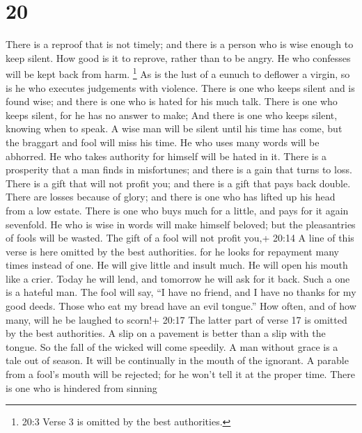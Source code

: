 \hypertarget{section-16}{%
\section{20}\label{section-16}}

 There is a reproof that is not timely; and there is a
person who is wise enough to keep silent.  How good is it to
reprove, rather than to be angry. He who confesses will be kept back
from harm.  \footnote{20:3 Verse 3 is omitted by the best
  authorities.}  As is the lust of a eunuch to deflower a
virgin, so is he who executes judgements with violence. 
There is one who keeps silent and is found wise; and there is one who is
hated for his much talk.  There is one who keeps silent, for
he has no answer to make; And there is one who keeps silent, knowing
when to speak.  A wise man will be silent until his time has
come, but the braggart and fool will miss his time.  He who
uses many words will be abhorred. He who takes authority for himself
will be hated in it.  There is a prosperity that a man finds
in misfortunes; and there is a gain that turns to loss. 
There is a gift that will not profit you; and there is a gift that pays
back double.  There are losses because of glory; and there
is one who has lifted up his head from a low estate.  There
is one who buys much for a little, and pays for it again sevenfold.
 He who is wise in words will make himself beloved; but the
pleasantries of fools will be wasted.  The gift of a fool
will not profit you,+ 20:14 A line of this verse is here omitted by the
best authorities. for he looks for repayment many times instead of one.
 He will give little and insult much. He will open his
mouth like a crier. Today he will lend, and tomorrow he will ask for it
back. Such a one is a hateful man.  The fool will say, ``I
have no friend, and I have no thanks for my good deeds. Those who eat my
bread have an evil tongue.''  How often, and of how many,
will he be laughed to scorn!+ 20:17 The latter part of verse 17 is
omitted by the best authorities.  A slip on a pavement is
better than a slip with the tongue. So the fall of the wicked will come
speedily.  A man without grace is a tale out of season. It
will be continually in the mouth of the ignorant.  A
parable from a fool's mouth will be rejected; for he won't tell it at
the proper time.  There is one who is hindered from sinning
